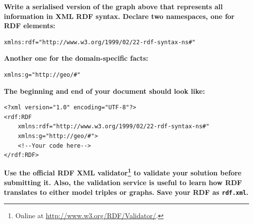 \documentclass[a4paper, 12pt]{scrartcl}
\begin{document}
\noindent \textbf{Write a serialised version of the graph above that represents all information in XML RDF syntax. Declare two namespaces, one for RDF elements:}
\lstset{language=XML}
\begin{lstlisting}
xmlns:rdf="http://www.w3.org/1999/02/22-rdf-syntax-ns#"
\end{lstlisting}
\textbf{Another one for the domain-specific facts:}
\lstset{language=XML}
\begin{lstlisting}
xmlns:g="http://geo/#"
\end{lstlisting}
\textbf{The beginning and end of your document should look like:}
\begin{lstlisting}
<?xml version="1.0" encoding="UTF-8"?>
<rdf:RDF
    xmlns:rdf="http://www.w3.org/1999/02/22-rdf-syntax-ns#"
    xmlns:g="http://geo/#">
    <!--Your code here-->
</rdf:RDF>
\end{lstlisting}
\textbf{Use the official RDF XML validator\footnote{Online at \url{http://www.w3.org/RDF/Validator/}.} to validate your solution before submitting it. Also, the validation service is useful to learn how RDF translates to either model triples or graphs. Save your RDF as \texttt{rdf.xml}.}
\end{document}
